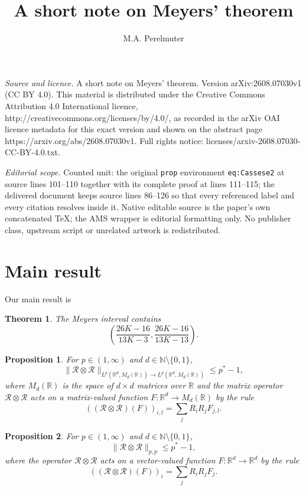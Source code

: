 \documentclass[10pt,a4paper]{amsart}
\newtheorem{theorem}{Theorem}
\newtheorem{prop}{Proposition}
\newcommand{\R}{{\mathbb R}}
\newcommand{\RV}{{\mathcal R}}
\newcommand{\RO}{{\RV\otimes\RV}}
\begin{document}
\title[A short note on Meyers' theorem]{A short note on Meyers' theorem}
\author{M.A. Perelmuter}
\date{}
\maketitle
\noindent\emph{Source and licence.} A short note on Meyers' theorem. Version arXiv:2608.07030v1 (CC BY 4.0). This material is distributed under the Creative Commons Attribution 4.0 International licence, http://creativecommons.org/licenses/by/4.0/, as recorded in the arXiv OAI licence metadata for this exact version and shown on the abstract page https://arxiv.org/abs/2608.07030v1. Full rights notice: licenses/arxiv-2608.07030-CC-BY-4.0.txt.\par\smallskip
\noindent\textit{Editorial scope.} Counted unit: the original \texttt{prop} environment \texttt{eq:Cassese2} at source lines 101--110 together with its complete proof at lines 111--115; the delivered document keeps source lines 86--126 so that every referenced label and every citation resolves inside it. Native editable source is the paper's own concatenated TeX; the AMS wrapper is editorial formatting only. No publisher class, upstream script or unrelated artwork is redistributed.
\section{Main result}
Our main result is
\begin{theorem}\label{main} The Meyers interval contains
$$\left(\frac{26K-16}{13K-3}, \frac{26K-16}{13K-13}\right).$$
\end{theorem}
\begin{prop}\label{eq:Cassese} \cite[Proposition 4.1]{Cassese}
For $p\in(1,\infty)$ and $d\in {\mathbb N}\setminus\{0,1\}$,
\begin{equation}\label{RieszMatrix}
\|\RO\|_{L^p(\R^d,M_d(\R))\to L^p(\R^d, M_d(\R))}\le p^*-1,
\end{equation}
where $M_d(\R)$ is the space of $d\times d$ matrices over $\R$ and the matrix operator $\RO$ acts on a matrix-valued function $F\colon\R^d\to M_d(\R)$ by the rule
\begin{equation*}
((\RO)(F))_{i,l}=\sum\limits_j R_i R_j F_{j,l}.
\end{equation*}
\end{prop}

\begin{prop}\label{eq:Cassese2}
For $p\in(1,\infty)$ and $d\in {\mathbb N}\setminus\{0,1\}$,
\begin{equation}\label{RieszVector}
\|\RO\|_{p,p}\le p^*-1,
\end{equation}
where the operator $\RO$ acts on a vector-valued function $F\colon\R^d\to \R^d$ by the rule
\begin{equation*}
((\RO)(F))_{i}=\sum\limits_j R_i R_j F_{j}.
\end{equation*}
\end{prop}
\end{document}
